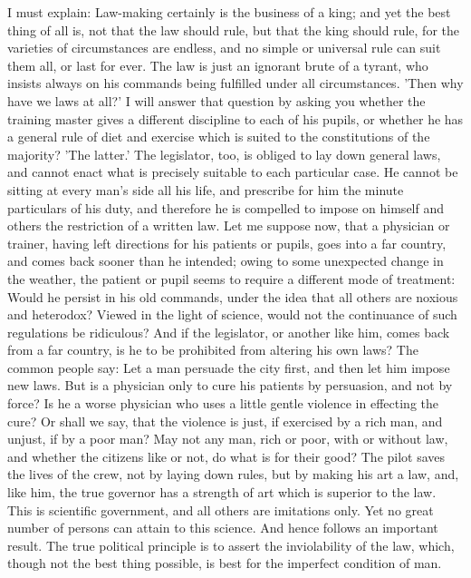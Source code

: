 \documentclass[11pt,letter]{article}
\begin{document}
\par  I must explain: Law-making certainly is the business of a king; and yet the best thing of all is, not that the law should rule, but that the king should rule, for the varieties of circumstances are endless, and no simple or universal rule can suit them all, or last for ever. The law is just an ignorant brute of a tyrant, who insists always on his commands being fulfilled under all circumstances. 'Then why have we laws at all?' I will answer that question by asking you whether the training master gives a different discipline to each of his pupils, or whether he has a general rule of diet and exercise which is suited to the constitutions of the majority? 'The latter.' The legislator, too, is obliged to lay down general laws, and cannot enact what is precisely suitable to each particular case. He cannot be sitting at every man's side all his life, and prescribe for him the minute particulars of his duty, and therefore he is compelled to impose on himself and others the restriction of a written law. Let me suppose now, that a physician or trainer, having left directions for his patients or pupils, goes into a far country, and comes back sooner than he intended; owing to some unexpected change in the weather, the patient or pupil seems to require a different mode of treatment: Would he persist in his old commands, under the idea that all others are noxious and heterodox? Viewed in the light of science, would not the continuance of such regulations be ridiculous? And if the legislator, or another like him, comes back from a far country, is he to be prohibited from altering his own laws? The common people say: Let a man persuade the city first, and then let him impose new laws. But is a physician only to cure his patients by persuasion, and not by force? Is he a worse physician who uses a little gentle violence in effecting the cure? Or shall we say, that the violence is just, if exercised by a rich man, and unjust, if by a poor man? May not any man, rich or poor, with or without law, and whether the citizens like or not, do what is for their good? The pilot saves the lives of the crew, not by laying down rules, but by making his art a law, and, like him, the true governor has a strength of art which is superior to the law. This is scientific government, and all others are imitations only. Yet no great number of persons can attain to this science. And hence follows an important result. The true political principle is to assert the inviolability of the law, which, though not the best thing possible, is best for the imperfect condition of man.
\end{document}
